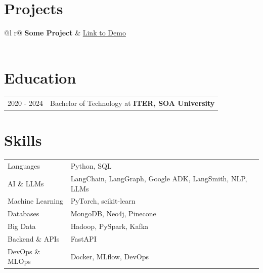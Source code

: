 \documentclass[a4paper,10pt]{article}
\begin{document}
\section{Projects}

\begin{tabularx}{\linewidth}{@{}l r@{}}
    \textbf{Some Project} & \hfill \href{https://some-link.com}{Link to Demo} \\[3.75pt]
     \\
\end{tabularx}

\section{Education}
\begin{tabularx}{\linewidth}{@{}l X@{}}
    2020 - 2024 & Bachelor of Technology at \textbf{ITER, SOA University} \\
\end{tabularx}

\section{Skills}
\begin{tabularx}{\linewidth}{@{}l X@{}}
    Languages          & \normalsize{Python, SQL} \\
    AI \& LLMs         & \normalsize{LangChain, LangGraph, Google ADK, LangSmith, NLP, LLMs} \\
    Machine Learning   & \normalsize{PyTorch, scikit-learn} \\
    Databases          & \normalsize{MongoDB, Neo4j, Pinecone} \\
    Big Data           & \normalsize{Hadoop, PySpark, Kafka} \\
    Backend \& APIs    & \normalsize{FastAPI} \\
    DevOps \& MLOps    & \normalsize{Docker, MLflow, DevOps} \\
\end{tabularx}

\vfill
{}
\end{document}
